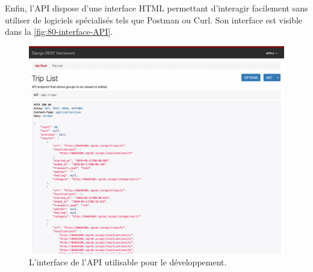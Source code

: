 Enfin, l'\gls{API} dispose d'une interface HTML permettant d'interagir facilement sans utiliser de logiciels spécialisés tels que Postman ou Curl. Son interface est visible dans la \autoref{fig:80-interface-API}.

\begin{figure}[h]
    \centering
    \includegraphics[keepaspectratio, width=2\textwidth/2, height=2\textheight/5]{ima/interface-api}
    \caption{L'interface de l'API utilisable pour le développement.}
    \label{fig:80-interface-API}
\end{figure}
